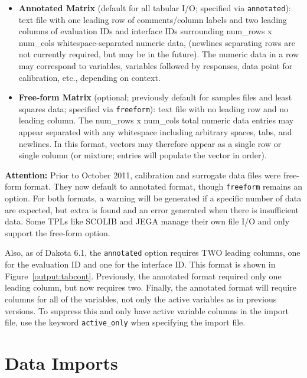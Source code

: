 \begin{itemize}
\item {\bf Annotated Matrix} (default for all tabular I/O; specified
  via {\tt annotated}): text file with one leading row of
  comments/column labels and two leading columns of evaluation IDs and 
  interface IDs
  surrounding num\_rows x num\_cols whitespace-separated numeric data,
  (newlines separating rows are not currently required, but may be in
  the future).  The numeric data in a row may correspond to variables,
  variables followed by responses, data point for calibration, etc.,
  depending on context.

\item {\bf Free-form Matrix} (optional; previously default for samples
  files and least squares data; specified via {\tt freeform}): text
  file with no leading row and no leading column.  The num\_rows x
  num\_cols total numeric data entries may appear separated with any
  whitespace including arbitrary spaces, tabs, and newlines.  In this
  format, vectors may therefore appear as a single row or single
  column (or mixture; entries will populate the vector in order).
\end{itemize}

{\bf Attention:} Prior to October 2011, calibration and surrogate data
files were free-form format.  They now default to annotated format,
though {\tt freeform} remains an option.  For both formats, a warning
will be generated if a specific number of data are expected, but extra
is found and an error generated when there is insufficient data.  Some
TPLs like SCOLIB and JEGA manage their own file I/O and only support
the free-form option.

Also, as of Dakota 6.1, the \texttt{annotated} option requires TWO 
leading columns, one for the evaluation ID and one for the interface ID. 
This format is shown in Figure~\ref{output:tabcont}.  Previously, 
the annotated format required only one leading column, but now requires two. 
Finally, the annotated format will require columns for all of the variables, 
not only the active variables as in previous versions.  To suppress 
this and only have active variable columns in the import file, use
the keyword \texttt{active\_only} when specifying the import file. 

\section{Data Imports}\label{input:import}

